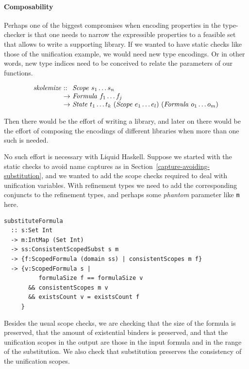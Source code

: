 \documentclass[sigconf]{acmart}
\newcommand{\tc}[1]{{\small\texttt{#1}}}
\begin{document}
\paragraph{Composability} Perhaps one of the biggest compromises when encoding properties in the type-checker
is that one needs to narrow the expressible properties to a feasible set that allows
to write a supporting library. If we wanted to have static checks like those of the
unification example, we would need new type encodings. Or in other words, new type indices
need to be conceived to relate the parameters of our functions.

$$\begin{array}{l@{\ }l@{\ }l}
    \mathit{skolemize} & \mathit{::}  & \mathit{Scope}\ s_1 \ldots s_n \\
                       & \rightarrow  & \mathit{Formula}\ f_1 \ldots f_j \\
                       & \rightarrow  & \mathit{State}\ t_1 \ldots t_k\ (\mathit{Scope}\ e_1 \ldots e_l)\ (\mathit{Formula}\ o_1 \ldots o_m)
\end{array}$$

Then there would be the effort of writing a library, and later on there would be the
effort of composing the encodings of different libraries when more than one such
is needed.

No such effort is necessary with Liquid Haskell. Suppose we started with the static
checks to avoid name captures as in Section~\ref{capture-avoiding-substitution}, and we
wanted to add the scope checks
required to deal with unification variables. With refinement types we need to add
the corresponding conjuncts to the refinement types, and perhaps some \textit{phantom}
parameter like \tc{m} here.

\begin{verbatim}
substituteFormula
  :: s:Set Int
  -> m:IntMap (Set Int)
  -> ss:ConsistentScopedSubst s m
  -> {f:ScopedFormula (domain ss) | consistentScopes m f}
  -> {v:ScopedFormula s |
          formulaSize f == formulaSize v
       && consistentScopes m v
       && existsCount v = existsCount f
     }
\end{verbatim}
Besides the usual scope checks, we are checking that the size of the formula
is preserved, that the amount of existential binders is preserved, and that
the unification scopes in the output are those in the input formula and in
the range of the substitution. We also check that substitution preserves
the consistency of the unification scopes.
\end{document}
